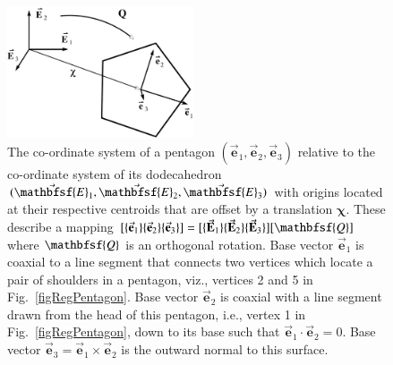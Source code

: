 \begin{figure}
    \centering
    \includegraphics[width=5.5cm]{figures/pentagonCoord.pdf}
    \caption{The co-ordinate system of a pentagon $( \vec{\mathbf{e}}_1 , \vec{\mathbf{e}}_2 , \vec{\mathbf{e}}_3 )$ relative to the co-ordinate system of its dodecahedron $( \vec{\mathbfsf{E}}_1 , \vec{\mathbfsf{E}}_2 , \vec{\mathbfsf{E}}_3 )$ with origins located at their respective centroids that are offset by a translation $\boldsymbol{\chi}$.  These describe a mapping $[ \{ \vec{\mathbf{e}}_1 \} \{ \vec{\mathbf{e}}_2 \} \{ \vec{\mathbf{e}}_3 \} ] = [ \{ \vec{\mathbf{E}}_1 \} \{ \vec{\mathbf{E}}_2 \} \{ \vec{\mathbf{E}}_3 \} ] [ \mathbfsf{Q} ]$ where $\mathbfsf{Q}$ is an orthogonal rotation.  Base vector $\vec{\mathbf{e}}_1$ is coaxial to a line segment that connects two vertices which locate a pair of shoulders in a pentagon, viz., vertices 2 and 5 in Fig.~\ref{figRegPentagon}.  Base vector $\vec{\mathbf{e}}_2$ is coaxial with a line segment drawn from the head of this pentagon, i.e., vertex 1 in Fig.~\ref{figRegPentagon}, down to its base such that $\vec{\mathbf{e}}_1 \cdot \vec{\mathbf{e}}_2 = 0$.  Base vector $\vec{\mathbf{e}}_3 = \vec{\mathbf{e}}_1 \times \vec{\mathbf{e}}_2$ is the outward normal to this surface.}
    \label{figPentagonCoord}
\end{figure}


